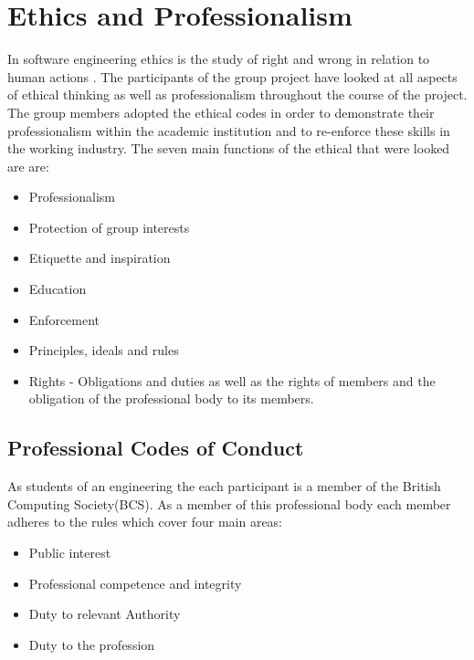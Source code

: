 \section{Ethics and Professionalism} 
\label{sec:ethics_and_professionalism}

In software engineering ethics is the study of right and wrong in relation to human actions \citep{profissues01}. The participants of the group project have looked at all aspects of ethical thinking as well as professionalism throughout the course of the project. The group members adopted the ethical codes in order to demonstrate their professionalism within the academic institution and to re-enforce these skills in the working industry. The seven main functions of the ethical that were looked are are:


\begin{itemize}
	\item Professionalism
	\item Protection of group interests
	\item Etiquette and inspiration
	\item Education
	\item Enforcement
	\item Principles, ideals and rules
	\item Rights - Obligations and duties as well as the rights of members and the obligation of the professional body to its members. 
\end{itemize}


\subsection{Professional Codes of Conduct}

As students of an engineering the each participant is a member of the British Computing Society(BCS). As a member of this professional body each member adheres to the rules which cover four main areas:

\begin{itemize}
	\item Public interest
	\item Professional competence and integrity
	\item Duty to relevant Authority
	\item Duty to the profession
\end{itemize}

\hfill{\citet{bcs14}}

